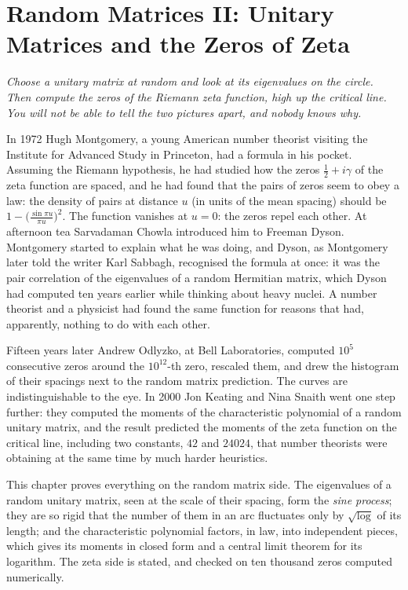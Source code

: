 \chapter{Random Matrices II: Unitary Matrices and the Zeros of Zeta}

\begin{center}\itshape
Choose a unitary matrix at random and look at its eigenvalues on the circle.\\
Then compute the zeros of the Riemann zeta function, high up the critical line.\\
You will not be able to tell the two pictures apart, and nobody knows why.
\end{center}

In 1972 Hugh Montgomery, a young American number theorist visiting the Institute for Advanced Study in Princeton, had a formula in his pocket. Assuming the Riemann hypothesis, he had studied how the
zeros $\frac12+i\gamma$ of the zeta function are spaced, and he had found that the pairs of zeros seem to obey a law: the density of pairs at distance $u$ (in units of the mean spacing) should be $1-\bigl(\frac{\sin\pi u}{\pi u}\bigr)^2$.
The function vanishes at $u=0$: the zeros repel each other. At afternoon tea Sarvadaman Chowla introduced him to Freeman Dyson. Montgomery started to explain what he was doing, and Dyson, as Montgomery later told the
writer Karl Sabbagh, recognised the formula at once: it was the pair correlation of the eigenvalues of a random Hermitian matrix, which Dyson had computed ten years earlier while thinking about heavy nuclei.
A number theorist and a physicist had found the same function for reasons that had, apparently, nothing to do with each other.

Fifteen years later Andrew Odlyzko, at Bell Laboratories, computed $10^5$ consecutive zeros around the $10^{12}$-th zero, rescaled them, and drew the histogram of their spacings next to the random matrix prediction. The curves are
indistinguishable to the eye. In 2000 Jon Keating and Nina Snaith went one step further: they computed the moments of the characteristic polynomial of a random unitary matrix, and the result predicted the moments of the
zeta function on the critical line, including two constants, $42$ and $24024$, that number theorists were obtaining at the same time by much harder heuristics.

This chapter proves everything on the random matrix side. The eigenvalues of a random unitary matrix, seen at the scale of their spacing, form the \emph{sine process}; they are so rigid that the number of them in an arc
fluctuates only by $\sqrt{\log}$ of its length; and the characteristic polynomial factors, in law, into independent pieces, which gives its moments in closed form and a central limit theorem for its logarithm. The zeta side is
stated, and checked on ten thousand zeros computed numerically.

